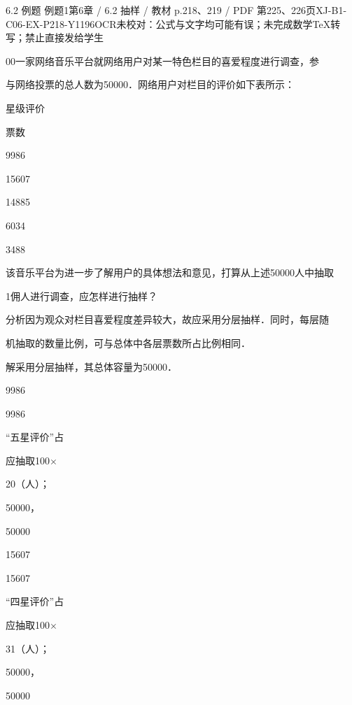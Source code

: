 \begin{bankitem}{6.2 例题 例题1}{第6章 / 6.2 抽样 / 教材 p.218、219 / PDF 第225、226页}{XJ-B1-C06-EX-P218-Y1196}{OCR未校对：公式与文字均可能有误；未完成数学TeX转写；禁止直接发给学生}
\begin{ocrdraft}
\par
00一家网络音乐平台就网络用户对某一特色栏目的喜爱程度进行调查，参
\par
与网络投票的总人数为50000．网络用户对栏目的评价如下表所示：
\par
星级评价
\par
票数
\par
9986
\par
15607
\par
14885
\par
6034
\par
3488
\par
该音乐平台为进一步了解用户的具体想法和意见，打算从上述50000人中抽取
\par
1佣人进行调查，应怎样进行抽样？
\par
分析因为观众对栏目喜爱程度差异较大，故应采用分层抽样．同时，每层随
\par
机抽取的数量比例，可与总体中各层票数所占比例相同．
\par
解采用分层抽样，其总体容量为50000．
\par
[教材p.219 / PDF第226页]
\par
9986
\par
9986
\par
“五星评价”占
\par
应抽取100\ensuremath{\times}
\par
20（人）；
\par
50000，
\par
50000
\par
15607
\par
15607
\par
“四星评价”占
\par
应抽取100\ensuremath{\times}
\par
31（人）；
\par
50000，
\par
50000

\end{ocrdraft}
\end{bankitem}
